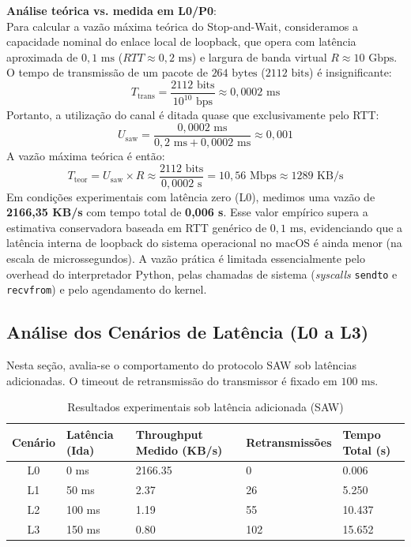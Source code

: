 \documentclass[12pt,a4paper]{article}
\begin{document}
\noindent \textbf{Análise teórica vs. medida em L0/P0}:
\\
Para calcular a vazão máxima teórica do Stop-and-Wait, consideramos a capacidade nominal do enlace local de loopback, que opera com latência aproximada de $0,1\text{ ms}$ ($RTT \approx 0,2\text{ ms}$) e largura de banda virtual $R \approx 10\text{ Gbps}$.
O tempo de transmissão de um pacote de $264\text{ bytes}$ ($2112\text{ bits}$) é insignificante:
\begin{equation*}
    T_{\text{trans}} = \frac{2112\text{ bits}}{10^{10}\text{ bps}} \approx 0,0002\text{ ms}
\end{equation*}
Portanto, a utilização do canal é ditada quase que exclusivamente pelo RTT:
\begin{equation*}
    U_{\text{saw}} = \frac{0,0002\text{ ms}}{0,2\text{ ms} + 0,0002\text{ ms}} \approx 0,001
\end{equation*}
A vazão máxima teórica é então:
\begin{equation*}
    T_{\text{teor}} = U_{\text{saw}} \times R \approx \frac{2112\text{ bits}}{0,0002\text{ s}} = 10,56\text{ Mbps} \approx 1289\text{ KB/s}
\end{equation*}
Em condições experimentais com latência zero (L0), medimos uma vazão de \textbf{2166,35 KB/s} com tempo total de \textbf{0,006 s}. Esse valor empírico supera a estimativa conservadora baseada em RTT genérico de $0,1\text{ ms}$, evidenciando que a latência interna de loopback do sistema operacional no macOS é ainda menor (na escala de microssegundos). A vazão prática é limitada essencialmente pelo overhead do interpretador Python, pelas chamadas de sistema (\textit{syscalls} \texttt{sendto} e \texttt{recvfrom}) e pelo agendamento do kernel.

\subsection{Análise dos Cenários de Latência (L0 a L3)}
Nesta seção, avalia-se o comportamento do protocolo SAW sob latências adicionadas. O timeout de retransmissão do transmissor é fixado em $100\text{ ms}$.

\begin{table}[H]
    \centering
    \caption{Resultados experimentais sob latência adicionada (SAW)}
    \begin{tabularx}{\textwidth}{c*{4}{Y}}
        \toprule
        \textbf{Cenário} & \textbf{Latência (Ida)} & \textbf{Throughput Medido (KB/s)} & \textbf{Retransmissões} & \textbf{Tempo Total (s)} \\
        \midrule
        L0 & 0 ms   & 2166.35 & 0   & 0.006  \\
        L1 & 50 ms  & 2.37    & 26  & 5.250  \\
        L2 & 100 ms & 1.19    & 55  & 10.437 \\
        L3 & 150 ms & 0.80    & 102 & 15.652 \\
        \bottomrule
    \end{tabularx}
    \label{tab:saw_latencia}
\end{table}
\end{document}
